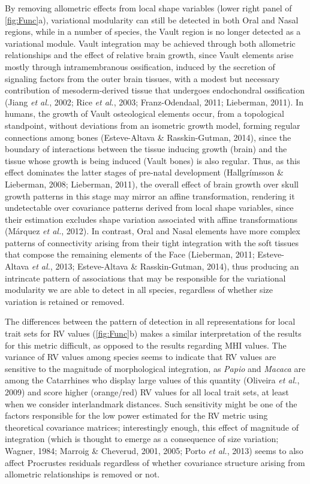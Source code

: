 \documentclass[12pt,twoside]{report}
\begin{document}
By removing allometric effects from local shape variables (lower right
panel of \autoref{fig:Func}a), variational modularity can still be
detected in both Oral and Nasal regions, while in a number of species,
the Vault region is no longer detected as a variational module. Vault
integration may be achieved through both allometric relationships and
the effect of relative brain growth, since Vault elements arise mostly
through intramembranous ossification, induced by the secretion of
signaling factors from the outer brain tissues, with a modest but
necessary contribution of mesoderm-derived tissue that undergoes
endochondral ossification (Jiang \emph{et al.}, 2002; Rice \emph{et
al.}, 2003; Franz-Odendaal, 2011; Lieberman, 2011). In humans, the
growth of Vault osteological elements occur, from a topological
standpoint, without deviations from an isometric growth model, forming
regular connections among bones (Esteve-Altava \& Rasskin-Gutman, 2014),
since the boundary of interactions between the tissue inducing growth
(brain) and the tissue whose growth is being induced (Vault bones) is
also regular. Thus, as this effect dominates the latter stages of
pre-natal development (Hallgrímsson \& Lieberman, 2008; Lieberman,
2011), the overall effect of brain growth over skull growth patterns in
this stage may mirror an affine transformation, rendering it
undetectable over covariance patterns derived from local shape
variables, since their estimation excludes shape variation associated
with affine transformations (Márquez \emph{et al.}, 2012). In contrast,
Oral and Nasal elements have more complex patterns of connectivity
arising from their tight integration with the soft tissues that compose
the remaining elements of the Face (Lieberman, 2011; Esteve-Altava
\emph{et al.}, 2013; Esteve-Altava \& Rasskin-Gutman, 2014), thus
producing an intrincate pattern of associations that may be responsible
for the variational modularity we are able to detect in all species,
regardless of whether size variation is retained or removed.

The differences between the pattern of detection in all representations
for local trait sets for RV values (\autoref{fig:Func}b) makes a similar
interpretation of the results for this metric difficult, as opposed to
the results regarding MHI values. The variance of RV values among
species seems to indicate that RV values are sensitive to the magnitude
of morphological integration, as \emph{Papio} and \emph{Macaca} are
among the Catarrhines who display large values of this quantity
(Oliveira \emph{et al.}, 2009) and score higher (orange/red) RV values
for all local trait sets, at least when we consider interlandmark
distances. Such sensitivity might be one of the factors responsible for
the low power estimated for the RV metric using theoretical covariance
matrices; interestingly enough, this effect of magnitude of integration
(which is thought to emerge as a consequence of size variation; Wagner,
1984; Marroig \& Cheverud, 2001, 2005; Porto \emph{et al.}, 2013) seems
to also affect Procrustes residuals regardless of whether covariance
structure arising from allometric relationships is removed or not.
\end{document}
